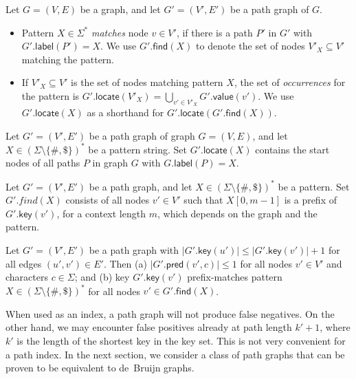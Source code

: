 \documentclass[a4paper,11pt]{llncs}
\newcommand{\set}[1]{\ensuremath{\{ #1 \}}}
\newcommand{\abs}[1]{\ensuremath{\lvert #1 \rvert}}
\newcommand{\find}{\ensuremath{\mathsf{find}}}
\newcommand{\locate}{\ensuremath{\mathsf{locate}}}
\newcommand{\glabel}{\ensuremath{\mathsf{label}}}
\newcommand{\gpred}{\ensuremath{\mathsf{pred}}}
\newcommand{\gkey}{\ensuremath{\mathsf{key}}}
\newcommand{\gvalue}{\ensuremath{\mathsf{value}}}
\newcommand{\patternset}{\ensuremath{(\Sigma \setminus \set{\#, \$})^{\ast}}}
\begin{document}
\begin{definition}
Let $G = (V, E)$ be a graph, and let $G' = (V', E')$ be a path graph of $G$.
\begin{itemize}
\item Pattern $X \in \Sigma^{\ast}$ \emph{matches} node $v \in V'$, if there is a path $P'$ in $G'$ with $G'.\glabel(P') = X$. We use $G'.\find(X)$ to denote the set of nodes $V'_{X} \subseteq V'$ matching the pattern.
\item If $V'_{X} \subseteq V'$ is the set of nodes matching pattern $X$, the set of \emph{occurrences} for the pattern is $G'.\locate(V'_{X}) = \bigcup_{v' \in V'_{X}} G'.\gvalue(v')$. We use $G'.\locate(X)$ as a shorthand for $G'.\locate(G'.\find(X))$.
\end{itemize}
\end{definition}

\begin{lemma}\label{lemma:pg-fn}
Let $G' = (V', E')$ be a path graph of graph $G = (V, E)$, and let $X \in \patternset$ be a pattern string. Set $G'.\locate(X)$ contains the start nodes of all paths $P$ in graph $G$ with $G.\glabel(P) = X$.
\end{lemma}

\begin{lemma}\label{lemma:pg-context}
Let $G' = (V', E')$ be a path graph, and let $X \in \patternset$ be a pattern. Set $G'.find(X)$ consists of all nodes $v' \in V'$ such that $X[0, m-1]$ is a prefix of $G'.\gkey(v')$, for a context length $m$, which depends on the graph and the pattern.
\end{lemma}

\begin{lemma}\label{lemma:pg-keys}
Let $G' = (V', E')$ be a path graph with $\abs{G'.\gkey(u')} \le \abs{G'.\gkey(v')}+1$ for all edges $(u', v') \in E'$. Then
(a) $\abs{G'.\gpred(v', c)} \le 1$ for all nodes $v' \in V'$ and characters $c \in \Sigma$; and
(b) key $G'.\gkey(v')$ prefix-matches pattern $X \in \patternset$ for all nodes $v' \in G'.\find(X)$.
\end{lemma}

When used as an index, a path graph will not produce false negatives. On the other hand, we may encounter false positives already at path length $k'+1$, where $k'$ is the length of the shortest key in the key set. This is not very convenient for a path index. In the next section, we consider a class of path graphs that can be proven to be equivalent to de~Bruijn graphs.
\end{document}
